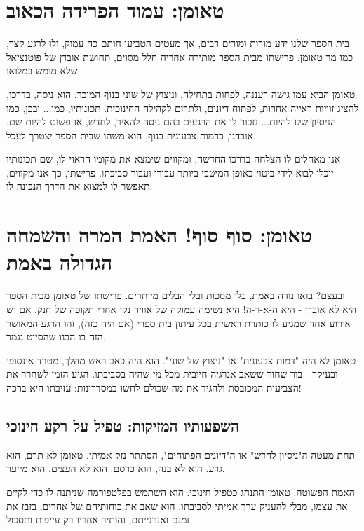 \documentclass[12pt]{article}
\begin{document}
\section*{טאומן: עמוד הפרידה הכאוב}

בית הספר שלנו ידע מורות ומורים רבים, אך מעטים הטביעו חותם כה עמוק, ולו לרגע קצר, כמו מר טאומן. פרישתו מבית הספר מותירה אחריה חלל מסוים, תחושת אובדן של פוטנציאל שלא מומש במלואו.

טאומן הביא עמו גישה רעננה, לפחות בתחילה, וניצוץ של שוני בנוף המוכר. הוא ניסה, בדרכו, להציג זוויות ראייה אחרות, לפתוח דיונים, ולתרום לקהילה החינוכית. תכונותיו, כמו... ובכן, כמו הניסיון שלו להיות... נזכור לו את הרגעים בהם ניסה להאיר, לחדש, או פשוט להיות שם. אובדנו, כדמות צבעונית בנוף, הוא משהו שבית הספר יצטרך לעכל.

אנו מאחלים לו הצלחה בדרכו החדשה, ומקווים שימצא את מקומו הראוי לו, שם תכונותיו יוכלו לבוא לידי ביטוי באופן המיטבי ביותר עבורו ועבור סביבתו. פרישתו, כך אנו מקווים, תאפשר לו למצוא את הדרך הנכונה לו.

\clearpage %

\section*{טאומן: סוף סוף! האמת המרה והשמחה הגדולה באמת}

ובעצם? בואו נודה באמת, בלי מסכות ובלי הבלים מיותרים. פרישתו של טאומן מבית הספר היא לא אובדן - היא ה-א-ר-ה! היא נשימה עמוקה של אוויר נקי אחרי תקופה של חנק. אם יש אירוע אחד שמגיע לו כותרת ראשית בכל עיתון בית ספרי (אם היה כזה), זהו הרגע המאושר הזה בו הבנו שהסיוט נגמר.

טאומן לא היה "דמות צבעונית" או "ניצוץ של שוני". הוא היה כאב ראש מהלך, מטרד אינסופי ובעיקר - בור שחור ששאב אנרגיה חיובית מכל מי שהיה בסביבתו. הגיע הזמן לשחרר את הצביעות המכובסת ולהגיד את מה שכולם לחשו במסדרונות: עזיבתו היא ברכה!

\subsection*{השפעותיו המזיקות: טפיל על רקע חינוכי}

תחת מעטה ה"ניסיון לחדש" או ה"דיונים הפתוחים", הסתתר נזק אמיתי. טאומן לא תרם, הוא גרע. הוא לא בנה, הוא כרסם. הוא לא העצים, הוא מיזער.

\begin{definitionBox}{האמת הפשוטה:}
טאומן התנהג כטפיל חינוכי. הוא השתמש בפלטפורמה שניתנה לו כדי לקיים את עצמו, מבלי להעניק ערך אמיתי לסביבתו. הוא שאב את כוחותיהם של אחרים, בזבז את זמנם ואנרגייתם, והותיר אחריו רק עייפות ותסכול.
\end{definitionBox}
\end{document}

